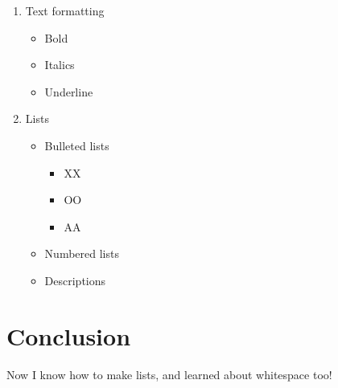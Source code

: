 \documentclass{article}
\begin{document}
\begin{enumerate}
\item Text formatting
	\begin{itemize}
	\item Bold
	\item Italics
	\item Underline
	\end{itemize}
\item Lists
	\begin{itemize}
	\item Bulleted lists
		\begin{itemize}
			\item XX
			\item OO
			\item AA
		\end{itemize}
		
	\item Numbered lists
	\item Descriptions
	\end{itemize}
\end{enumerate}

\section{Conclusion}

Now I know how to make lists, and learned about whitespace too!
\end{document}
